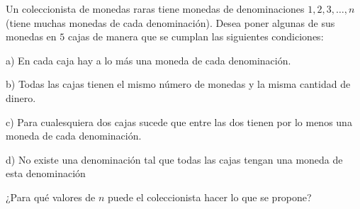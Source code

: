 Un coleccionista de monedas raras tiene monedas de denominaciones $1,2,3,\dots,n$ (tiene muchas monedas de cada denominación). Desea poner algunas de sus monedas en $5$ cajas de manera que se cumplan las siguientes condiciones:

a) En cada caja hay a lo más una moneda de cada denominación.

b) Todas las cajas tienen el mismo número de monedas y la misma cantidad de dinero.

c) Para cualesquiera dos cajas sucede que entre las dos tienen por lo menos una moneda de cada denominación.

d) No existe una denominación tal que todas las cajas tengan una moneda de esta denominación

¿Para qué valores de $n$ puede el coleccionista hacer lo que se propone?